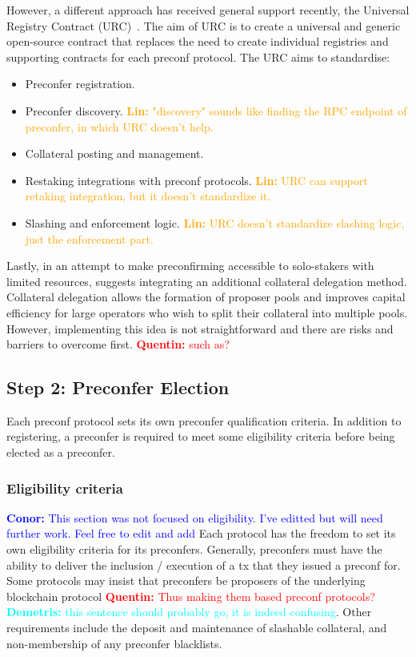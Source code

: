 \documentclass[a4paper]{article}
\theoremstyle{boldstyle}
\newcommand{\cm}[1]{\textcolor{blue}{\textbf{Conor:} #1}}
\newcommand{\qb}[1]{\textcolor{red}{\textbf{Quentin:} #1}}
\newcommand{\lo}[1]{\textcolor{orange}{\textbf{Lin:} #1}}
\newcommand{\dk}[1]{\textcolor{cyan}{\textbf{Demetris:} #1}}
\begin{document}
        However, a different approach has received general support recently, the Universal Registry Contract (URC)~\cite{W:UniversalRegistryContract}. The aim of URC is to create a universal and generic open-source contract that replaces the need to create individual registries and supporting contracts for each preconf protocol. The URC aims to standardise:
         \begin{itemize} 
             \item Preconfer registration.
             \item Preconfer discovery. \lo{"discovery" sounds like finding the RPC endpoint of preconfer, in which URC doesn't help.}
             \item Collateral posting and management.
             \item Restaking integrations with preconf protocols. \lo{URC can support retaking integration, but it doesn't standardize it.}
             \item Slashing and enforcement logic. \lo{URC doesn't standardize slashing logic, just the enforcement part.}
         \end{itemize}

        Lastly, in an attempt to make preconfirming accessible to solo-stakers with limited resources, \cite{W:CrediblyNeutralPreconfirmationCollateral:ThePreconfirmationRegistry} suggests integrating an additional collateral delegation method. Collateral delegation allows the formation of proposer pools and improves capital efficiency for large operators who wish to split their collateral into multiple pools. However, implementing this idea is not straightforward and there are risks and barriers to overcome first. \qb{such as?}

\subsection{Step 2: Preconfer Election}
        Each preconf protocol sets its own preconfer qualification criteria. 
    In addition to registering, a preconfer is required to meet some eligibility criteria before being elected as a preconfer.
        \subsubsection{Eligibility criteria}
        \cm{This section was not focused on eligibility. I've editted but will need further work. Feel free to edit and add} 
        Each protocol has the freedom to set its own eligibility criteria for its preconfers. Generally, preconfers must have the ability to deliver the inclusion / execution of a tx that they issued a preconf for. Some protocols may insist that preconfers be proposers of the underlying blockchain protocol \qb{Thus making them based preconf protocols?}\dk{this sentence should probably go, it is indeed confusing}. Other requirements include the deposit and maintenance of slashable collateral, and non-membership of any preconfer blacklists. 
\end{document}
